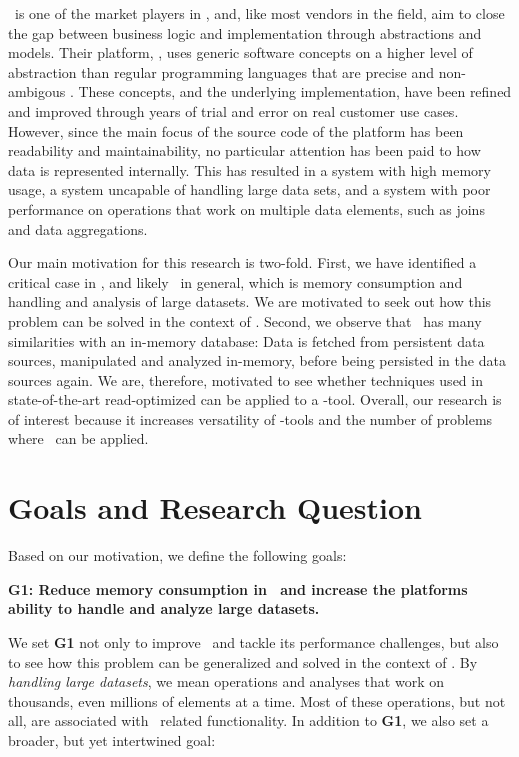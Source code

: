 \genus~is one of the market players in \mde, and, like most vendors in the field, aim to close the gap between business logic and implementation through abstractions and models. Their platform, \gap, uses generic software concepts on a higher level of abstraction than regular programming languages that are precise and non-ambigous \cite{noauthor_undated-qy}. These concepts, and the underlying implementation, have been refined and improved through years of trial and error on real customer use cases. However, since the main focus of the source code of the platform has been readability and maintainability, no particular attention has been paid to how data is represented internally. This has resulted in a system with high memory usage, a system uncapable of handling large data sets, and a system with poor performance on operations that work on multiple data elements, such as joins and data aggregations.

Our main motivation for this research is two-fold. First, we have identified a critical case in \gap, and likely \mde~in general, which is memory consumption and handling and analysis of large datasets. We are motivated to seek out how this problem can be solved in the context of \mdd. Second, we observe that \gap~has many similarities with an in-memory database: Data is fetched from persistent data sources, manipulated and analyzed in-memory, before being persisted in the data sources again. We are, therefore, motivated to see whether techniques used in state-of-the-art read-optimized can be applied to a \mde-tool. Overall, our research is of interest because it increases versatility of \mdd-tools and the number of problems where \mde~can be applied.

\section{Goals and Research Question}
\label{sec:Goals and Research Question}
Based on our motivation, we define the following goals:

\setlength{\leftskip}{1cm}

\textbf{G1: Reduce memory consumption in \gap~and increase the platforms ability to handle and analyze large datasets.}

\setlength{\leftskip}{0pt}

We set \textbf{G1} not only to improve \gap~and tackle its performance challenges, but also to see how this problem can be generalized and solved in the context of \mde. By \textit{handling large datasets}, we mean operations and analyses that work on thousands, even millions of elements at a time. Most of these operations, but not all, are associated with \bi~related functionality. In addition to \textbf{G1}, we also set a broader, but yet intertwined goal:

